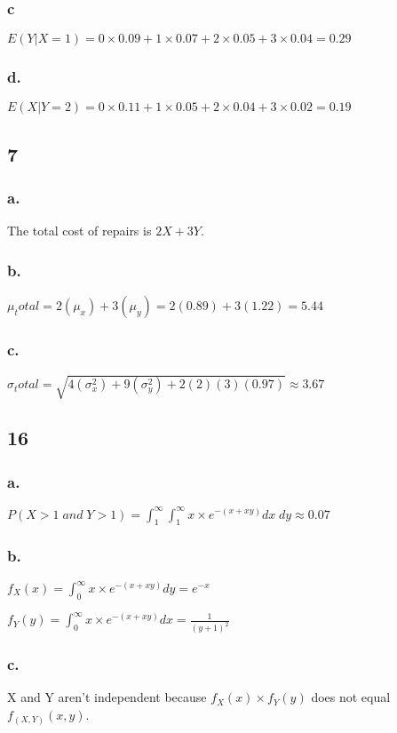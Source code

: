 \documentclass[11pt]{article}
\begin{document}
\subsubsection{c}
$E(Y|X=1) = 0 \times 0.09 + 1 \times 0.07 + 2 \times 0.05 + 3 \times 0.04 = 0.29$

\subsubsection{d.}
$E(X|Y=2) = 0 \times 0.11 + 1 \times 0.05 + 2 \times 0.04 + 3 \times 0.02 = 0.19$

\subsection{7}
\subsubsection{a.}
The total cost of repairs is $2X+3Y$. 

\subsubsection{b.}
$\mu_total = 2(\mu_x) + 3(\mu_y) = 2(0.89)+3(1.22) = 5.44$

\subsubsection{c.}
$\sigma_total = \sqrt{4(\sigma_x^2) + 9(\sigma_y^2) + 2(2)(3)(0.97)} \approx 3.67$

\subsection{16}
\subsubsection{a.}
$P(X>1 \; and \; Y>1) = \int_{1}^{\infty}\int_{1}^{\infty} x \times e^{-(x+xy)} dx \;
dy \approx 0.07$
\subsubsection{b.}
$f_X(x) = \int_{0}^{\infty} x \times e^{-(x+xy)} dy = e^{-x}$

$f_Y(y) = \int_{0}^{\infty} x \times e^{-(x+xy)} dx = \frac{1}{(y+1)^2}$
\subsubsection{c.}
X and Y aren't independent because $f_X(x)\times f_Y(y)$ does not equal
$f_(X,Y)(x, y)$. 
\end{document}
